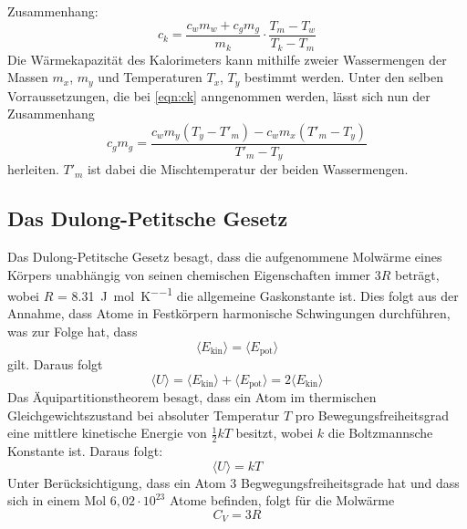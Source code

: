Zusammenhang:
\begin{equation}
  c_k= \frac {c_w m_w + c_g m_g}{m_k} \cdot \frac{T_m-T_w}{T_k-T_m} \label{eqn:ck}
\end{equation}
Die Wärmekapazität des Kalorimeters kann mithilfe zweier Wassermengen der Massen $m_x$, $m_y$ und
Temperaturen $T_x$, $T_y$ bestimmt werden.
Unter den selben Vorraussetzungen, die bei \eqref{eqn:ck} anngenommen werden, lässt sich nun der Zusammenhang
\begin{equation}
  c_g m_g=\frac{c_w m_y \left(T_y-T'_m \right)-c_w m_x \left(T'_m-T_y \right)}{T'_m-T_y}
  \label{eqn:kal}
\end{equation}
herleiten. $T'_m$ ist dabei die Mischtemperatur der beiden Wassermengen.

\subsection{Das Dulong-Petitsche Gesetz}
Das Dulong-Petitsche Gesetz besagt, dass die aufgenommene Molwärme eines Körpers unabhängig von seinen
chemischen Eigenschaften immer $3R$ beträgt, wobei $R$ = \SI{8,31}{\joule\per\mol\per\kelvin} \cite{sample3} die allgemeine Gaskonstante ist.
Dies folgt aus der Annahme, dass Atome in Festkörpern harmonische Schwingungen durchführen, was zur Folge hat, dass
\begin{equation}
  \langle E_\text{kin} \rangle = \langle E_\text{pot} \rangle
\end{equation}
gilt.
Daraus folgt
\begin{equation}
  \langle U \rangle=\langle E_\text{kin} \rangle + \langle E_\text{pot} \rangle=2\langle E_\text{kin} \rangle
\end{equation}
Das Äquipartitionstheorem besagt, dass ein Atom im thermischen Gleichgewichtszustand bei absoluter
Temperatur $T$ pro Bewegungsfreiheitsgrad eine mittlere kinetische Energie von $\frac{1}{2} kT$ besitzt,
wobei $k$ die Boltzmannsche Konstante ist.
Daraus folgt:
\begin{equation}
  \langle U \rangle=kT
\end{equation}
Unter Berücksichtigung, dass ein Atom 3 Begwegungsfreiheitsgrade hat und dass sich in einem Mol $6,02\cdot 10^{23}$ Atome
befinden, folgt für die Molwärme
\begin{equation}
  C_V=3R
\end{equation}

